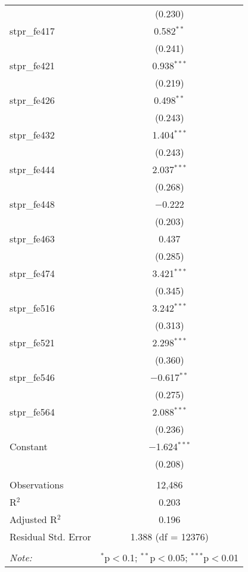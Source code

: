 \begin{table}[!htbp]
\begin{tabular}{@{\extracolsep{5pt}}lc}
  & (0.230) \\ 
  stpr\_fe417 & 0.582$^{**}$ \\ 
  & (0.241) \\ 
  stpr\_fe421 & 0.938$^{***}$ \\ 
  & (0.219) \\ 
  stpr\_fe426 & 0.498$^{**}$ \\ 
  & (0.243) \\ 
  stpr\_fe432 & 1.404$^{***}$ \\ 
  & (0.243) \\ 
  stpr\_fe444 & 2.037$^{***}$ \\ 
  & (0.268) \\ 
  stpr\_fe448 & $-$0.222 \\ 
  & (0.203) \\ 
  stpr\_fe463 & 0.437 \\ 
  & (0.285) \\ 
  stpr\_fe474 & 3.421$^{***}$ \\ 
  & (0.345) \\ 
  stpr\_fe516 & 3.242$^{***}$ \\ 
  & (0.313) \\ 
  stpr\_fe521 & 2.298$^{***}$ \\ 
  & (0.360) \\ 
  stpr\_fe546 & $-$0.617$^{**}$ \\ 
  & (0.275) \\ 
  stpr\_fe564 & 2.088$^{***}$ \\ 
  & (0.236) \\ 
  Constant & $-$1.624$^{***}$ \\ 
  & (0.208) \\ 
 \hline \\[-1.8ex] 
Observations & 12,486 \\ 
R$^{2}$ & 0.203 \\ 
Adjusted R$^{2}$ & 0.196 \\ 
Residual Std. Error & 1.388 (df = 12376) \\ 
\hline 
\hline \\[-1.8ex] 
\textit{Note:}  & \multicolumn{1}{r}{$^{*}$p$<$0.1; $^{**}$p$<$0.05; $^{***}$p$<$0.01} \\ 
\end{tabular} 
\end{table} 
